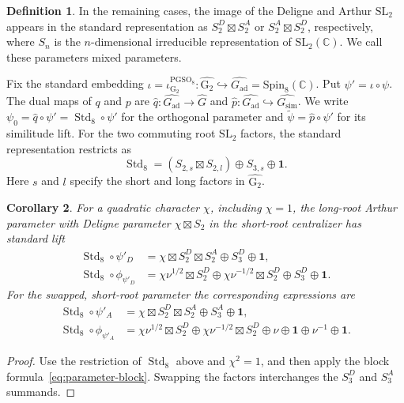 \documentclass[12pt]{amsart}
\theoremstyle{definition}
\newtheorem{definition}{Definition}[section]
\theoremstyle{plain}
\newtheorem{corollary}[definition]{Corollary}
\theoremstyle{remark}
\def\C{\mathbb{C}}%
\def\SL{\mathrm{SL}}
\def\Spin{\mathrm{Spin}}
\def\PGSO{\mathrm{PGSO}}
\DeclareMathOperator{\Std}{Std}
\numberwithin{equation}{section}
\newcommand{\rG}{\mathrm{G}}
\begin{document}
\begin{definition}
      In the remaining cases, the image of the Deligne and Arthur $\SL_2$ appears in the standard representation as $S_2^D\boxtimes S_2^A$ or $S_2^A\boxtimes S_2^D$, respectively, where $S_n$ is the $n$-dimensional irreducible representation of $\SL_2(\C)$.
      We call these parameters mixed parameters.
\end{definition}


Fix the standard embedding $\iota = \iota^{\PGSO_8}_{\rG_2} : \widehat{\rG_2}\hookrightarrow\widehat{G_{\mathrm{ad}}}=\Spin_8(\C)$.
Put $\psi'=\iota\circ\psi$. The dual maps of $q$ and $p$ are
$\widehat q:\widehat{G_{\mathrm{ad}}}\to\widehat G$ and
$\widehat p:\widehat{G_{\mathrm{ad}}}\hookrightarrow\widehat{G_{\mathrm{sim}}}$.
We write $\psi_0=\widehat q\circ\psi'=\Std_8\circ\psi'$ for
the orthogonal parameter and $\widetilde\psi=\widehat p\circ\psi'$
for its similitude lift. For the two
commuting root $\SL_2$ factors, the standard representation restricts as
\[
 \Std_8=(S_{2,s}\boxtimes S_{2,l})\oplus S_{3,s}\oplus\mathbf1.
\]
Here $s$ and $l$ specify the short and long factors in $\widehat{\rG_2}$.

\begin{corollary}\label{cor:mixed-parameters}
For a quadratic character $\chi$, including $\chi=1$, the long-root
Arthur parameter with Deligne parameter $\chi\boxtimes S_2$ in the
short-root centralizer has standard lift
\begin{align*}
 \Std_8\circ\psi'_D&=\chi\boxtimes S_2^D\boxtimes S_2^A
                       \oplus S_3^D\oplus\mathbf1,\\
 \Std_8\circ\phi_{\psi'_D}&=
  \chi\nu^{1/2}\boxtimes S_2^D\oplus\chi\nu^{-1/2}\boxtimes S_2^D
                       \oplus S_3^D\oplus\mathbf1.
\end{align*}
For the swapped, short-root parameter the corresponding expressions are
\begin{align*}
 \Std_8\circ\psi'_A&=\chi\boxtimes S_2^D\boxtimes S_2^A
                       \oplus S_3^A\oplus\mathbf1,\\
 \Std_8\circ\phi_{\psi'_A}&=
  \chi\nu^{1/2}\boxtimes S_2^D\oplus\chi\nu^{-1/2}\boxtimes S_2^D
                       \oplus\nu\oplus\mathbf1\oplus\nu^{-1}\oplus\mathbf1.
\end{align*}
\end{corollary}
\begin{proof}
Use the restriction of $\Std_8$ above and $\chi^2=1$, and then apply
the block formula~\eqref{eq:parameter-block}. Swapping the factors interchanges the
$S_3^D$ and $S_3^A$ summands.
\end{proof}
\end{document}
